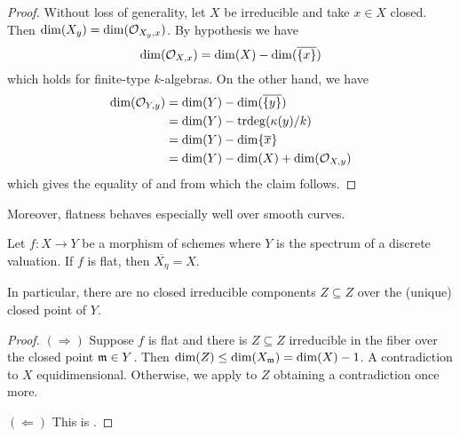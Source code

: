 \begin{proof}
    Without loss of generality, let $X$ be irreducible and take $x\in X$ closed. Then $\dim(X_{y})=\dim(\mathcal{O}_{X_{y},x})$. By hypothesis we have 
    $$\dim(\mathcal{O}_{X,x})=\dim(X)-\dim(\overline{\{x\}})$$
    which holds for finite-type $k$-algebras. On the other hand, we have 
    \begin{align*}
        \dim(\mathcal{O}_{Y,y}) &= \dim(Y)-\dim(\overline{\{y\}}) \\
        &= \dim(Y)-\mathrm{trdeg}(\kappa(y)/k) \\
        &= \dim(Y)-\dim\{\overline{x}\} \\
        &= \dim(Y)-\dim(X)+\dim(\mathcal{O}_{X,y})
    \end{align*}
    which gives the equality of  and from which the claim follows. 
\end{proof}
Moreover, flatness behaves especially well over smooth curves. 
\begin{proposition}\label{prop: flatness over curves}
    Let $f:X\to Y$ be a morphism of schemes where $Y$ is the spectrum of a discrete valuation. If $f$ is flat, then $\overline{X_{\eta}}=X$. 
\end{proposition}
In particular, there are no closed irreducible components $Z\subseteq Z$ over the (unique) closed point of $Y$. 
\begin{proof}
    $(\Rightarrow)$ Suppose $f$ is flat and there is $Z\subseteq Z$ irreducible in the fiber over the closed point $\mathfrak{m}\in Y$. Then $\dim(Z)\leq \dim(X_{\mathfrak{m}})=\dim(X)-1$. A contradiction to $X$ equidimensional. Otherwise, we apply  to $Z$ obtaining a contradiction once more. 

    $(\Leftarrow)$ This is \cite[Prop III.9.7]{Hartshorne}.
\end{proof}